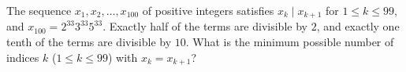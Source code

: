 The sequence $x_1,x_2,\dots,x_{100}$ of positive integers satisfies $x_k\mid x_{k+1}$ for $1\le k\le99$, and $x_{100}=2^{33}3^{33}5^{33}$. Exactly half of the terms are divisible by $2$, and exactly one tenth of the terms are divisible by $10$. What is the minimum possible number of indices $k$ ($1\le k\le99$) with $x_k=x_{k+1}$?
